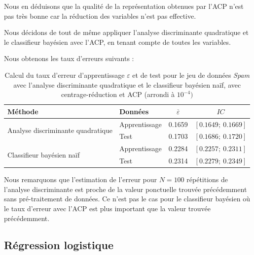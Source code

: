 \documentclass{article}
\begin{document}
Nous en déduisons que la qualité de la représentation obtenues par l'ACP n'est pas très bonne car la réduction des variables n'est pas effective.

Nous décidons de tout de même appliquer l'analyse discriminante quadratique et le classifieur bayésien avec l'ACP, en tenant compte de toutes les variables.

Nous obtenons les taux d'erreurs suivants :



\begin{table}[H]
\centering
\caption{Calcul du taux d'erreur d'apprentissage $\varepsilon$ et de test pour le jeu de données \textit{Spam} avec l'analyse discriminante quadratique et le classifieur bayésien naïf, avec centrage-réduction et ACP (arrondi à $10^{-4})$}
\begin{tabular}{l|l|cc}
\multicolumn{1}{l|}{\textbf{Méthode}}    & \textbf{Données} &$ \overline{\varepsilon}$ & $IC$                      \\ \hline
\multirow{2}{*}{Analyse discriminante quadratique}                  & Apprentissage    & 0.1659                             & $\left[0.1649 ;~ 0.1669 \right]$  \\
                                       & Test             & 0.1703                                 & $\left[0.1686 ;~ 0.1720 \right]$ \\ \hline
\multirow{2}{*}{Classifieur bayésien naïf}                  & Apprentissage    & 0.2284                             & $\left[0.2257;~ 0.2311 \right]$  \\
                                       & Test             & 0.2314                                 & $\left[0.2279 ;~ 0.2349 \right]$ \\ 
\end{tabular}

\label{spam_ad}
\end{table}

Nous remarquons que l'estimation de l'erreur pour $N=100$ répétitions de l'analyse discriminante est proche de la valeur ponctuelle trouvée précédemment sans pré-traitement de données. Ce n'est pas le cas pour le classifieur bayésien où le taux d'erreur avec l'ACP est plus important que la valeur trouvée précédemment.


\subsection{Régression logistique}
\end{document}
